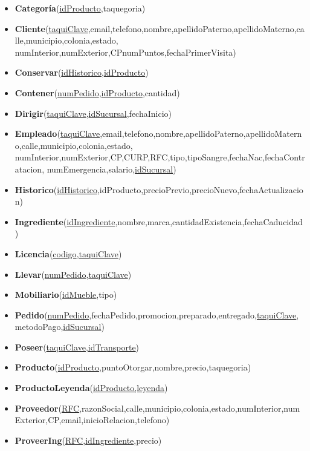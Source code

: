 \documentclass[11pt,letterpaper]{article}
\begin{document}
\begin{itemize}
\item \footnotesize{\textbf{Categoría}(\underline{idProducto},taquegoria)}
\item \footnotesize{\textbf{Cliente}(\underline{taquiClave},email,telefono,nombre,apellidoPaterno,apellidoMaterno,calle,municipio,colonia,estado,
numInterior,numExterior,CPnumPuntos,fechaPrimerVisita)}
\item \footnotesize{\textbf{Conservar}(\underline{idHistorico},\underline{idProducto})}
\item \footnotesize{\textbf{Contener}(\underline{numPedido},\underline{idProducto},cantidad)}
\item \footnotesize{\textbf{Dirigir}(\underline{taquiClave},\underline{idSucursal},fechaInicio)}
\item \footnotesize{\textbf{Empleado}(\underline{taquiClave},email,telefono,nombre,apellidoPaterno,apellidoMaterno,calle,municipio,colonia,estado,
numInterior,numExterior,CP,CURP,RFC,tipo,tipoSangre,fechaNac,fechaContratacion,
numEmergencia,salario,\underline{idSucursal})}
\item \footnotesize{\textbf{Historico}(\underline{idHistorico},idProducto,precioPrevio,precioNuevo,fechaActualizacion)}
\item \footnotesize{\textbf{Ingrediente}(\underline{idIngrediente},nombre,marca,cantidadExistencia,fechaCaducidad)}
\item \footnotesize{\textbf{Licencia}(\underline{codigo},\underline{taquiClave}})
\item \footnotesize{\textbf{Llevar}(\underline{numPedido},\underline{taquiClave})}
\item \footnotesize{\textbf{Mobiliario}(\underline{idMueble},tipo)}
\item \footnotesize{\textbf{Pedido}(\underline{numPedido},fechaPedido,promocion,preparado,entregado,\underline{taquiClave},metodoPago,\underline{idSucursal})}
\item \footnotesize{\textbf{Poseer}(\underline{taquiClave},\underline{idTransporte})}
\item \footnotesize{\textbf{Producto}(\underline{idProducto},puntoOtorgar,nombre,precio,taquegoria)}
\item \footnotesize{\textbf{ProductoLeyenda}(\underline{idProducto,leyenda})}
\item \scriptsize{\textbf{Proveedor}(\underline{RFC},razonSocial,calle,municipio,colonia,estado,numInterior,numExterior,CP,email,inicioRelacion,telefono)}
\item \footnotesize{\textbf{ProveerIng}(\underline{RFC},\underline{idIngrediente},precio)}

\end{itemize}
\end{document}
